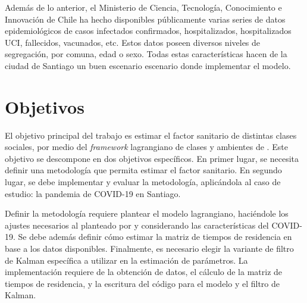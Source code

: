 \begin{intro}
Además de lo anterior, el Ministerio de Ciencia, Tecnología, Conocimiento e Innovación de Chile ha hecho disponibles públicamente \cite{MINCIENCIA} varias series de datos epidemiológicos de casos infectados confirmados, hospitalizados, hospitalizados UCI, fallecidos, vacunados, etc. Estos datos poseen diversos niveles de segregación, por comuna, edad o sexo. Todas estas características hacen de la ciudad de Santiago un buen escenario escenario donde implementar el modelo.




\section*{Objetivos}

El objetivo principal del trabajo es estimar el factor sanitario de distintas clases sociales, por medio del \textit{framework} lagrangiano de clases y ambientes de \cite{Bichara2018}. Este objetivo se descompone en dos objetivos específicos. En primer lugar, se necesita definir una metodología que permita estimar el factor sanitario. En segundo lugar, se debe implementar y evaluar la metodología, aplicándola al caso de estudio: la pandemia de COVID-19 en Santiago. 

Definir la metodología requiere plantear el modelo lagrangiano, haciéndole los ajustes necesarios al planteado por \cite{Bichara2018} y considerando las características del COVID-19. Se debe además definir cómo estimar la matriz de tiempos de residencia en base a los datos disponibles. Finalmente, es necesario elegir la variante de filtro de Kalman específica a utilizar en la estimación de parámetros. La implementación requiere de la obtención de datos, el cálculo de la matriz de tiempos de residencia, y la escritura del código para el modelo y el filtro de Kalman.



\end{intro}
